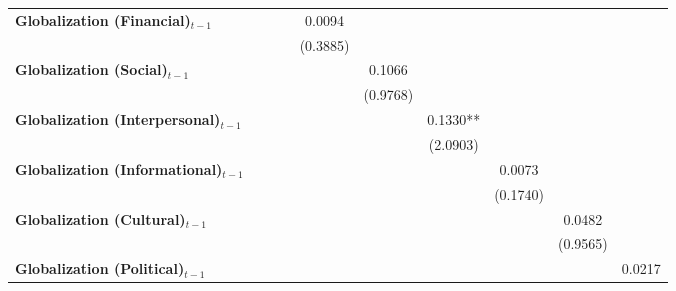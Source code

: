 \begin{center}
\begin{tabular}{lccccccccc}
\textbf{Globalization (Financial)$_{t-1}$}             &                &                  &                  &      0.0094      &                  &                  &                  &                  &                   \\
\textbf{ }                         &                &                  &                  &     (0.3885)     &                  &                  &                  &                  &                   \\
\textbf{Globalization (Social)$_{t-1}$}             &                &                  &                  &                  &      0.1066      &                  &                  &                  &                   \\
\textbf{ }                         &                &                  &                  &                  &     (0.9768)     &                  &                  &                  &                   \\
\textbf{Globalization (Interpersonal)$_{t-1}$}             &                &                  &                  &                  &                  &     0.1330**     &                  &                  &                   \\
\textbf{ }                         &                &                  &                  &                  &                  &     (2.0903)     &                  &                  &                   \\
\textbf{Globalization (Informational)$_{t-1}$}             &                &                  &                  &                  &                  &                  &      0.0073      &                  &                   \\
\textbf{ }                         &                &                  &                  &                  &                  &                  &     (0.1740)     &                  &                   \\
\textbf{Globalization (Cultural)$_{t-1}$}             &                &                  &                  &                  &                  &                  &                  &      0.0482      &                   \\
\textbf{ }                         &                &                  &                  &                  &                  &                  &                  &     (0.9565)     &                   \\
\textbf{Globalization (Political)$_{t-1}$}             &                &                  &                  &                  &                  &                  &                  &                  &      0.0217       \\

\end{tabular}
\end{center}
